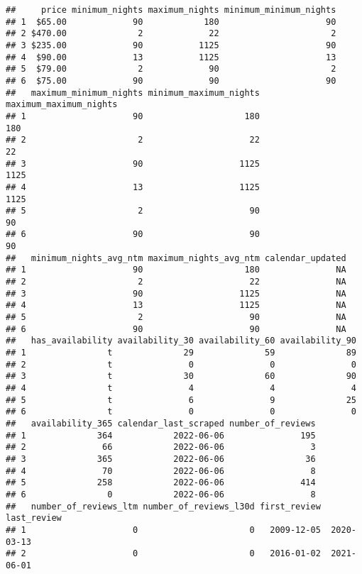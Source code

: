 \documentclass[
]{article}
\begin{document}
\begin{verbatim}
##     price minimum_nights maximum_nights minimum_minimum_nights
## 1  $65.00             90            180                     90
## 2 $470.00              2             22                      2
## 3 $235.00             90           1125                     90
## 4  $90.00             13           1125                     13
## 5  $79.00              2             90                      2
## 6  $75.00             90             90                     90
##   maximum_minimum_nights minimum_maximum_nights maximum_maximum_nights
## 1                     90                    180                    180
## 2                      2                     22                     22
## 3                     90                   1125                   1125
## 4                     13                   1125                   1125
## 5                      2                     90                     90
## 6                     90                     90                     90
##   minimum_nights_avg_ntm maximum_nights_avg_ntm calendar_updated
## 1                     90                    180               NA
## 2                      2                     22               NA
## 3                     90                   1125               NA
## 4                     13                   1125               NA
## 5                      2                     90               NA
## 6                     90                     90               NA
##   has_availability availability_30 availability_60 availability_90
## 1                t              29              59              89
## 2                t               0               0               0
## 3                t              30              60              90
## 4                t               4               4               4
## 5                t               6               9              25
## 6                t               0               0               0
##   availability_365 calendar_last_scraped number_of_reviews
## 1              364            2022-06-06               195
## 2               66            2022-06-06                 3
## 3              365            2022-06-06                36
## 4               70            2022-06-06                 8
## 5              258            2022-06-06               414
## 6                0            2022-06-06                 8
##   number_of_reviews_ltm number_of_reviews_l30d first_review last_review
## 1                     0                      0   2009-12-05  2020-03-13
## 2                     0                      0   2016-01-02  2021-06-01

\end{verbatim}
\end{document}
